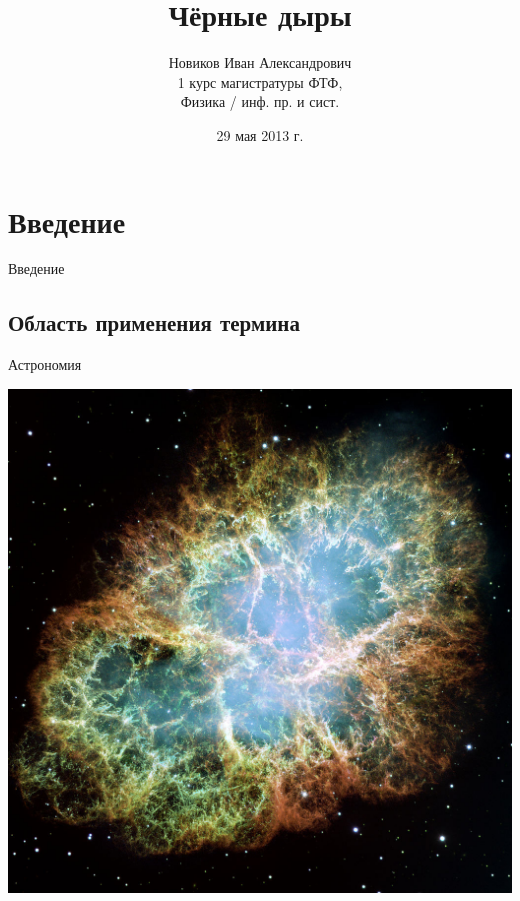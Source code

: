 \documentclass[usenames,dvipsnames,pdftex,unicode,hidelinks]{beamer}
\title[Чёрные дыры]{Чёрные дыры}
\author[Иван Новиков]{
  Новиков Иван Александрович\texorpdfstring{
    \\
    \vspace{0.5cm}
    \small 1 курс магистратуры ФТФ,\\
           Физика / инф. пр. и сист.
  }{
    - КубГУ, ФТФ, 1 курс магистратуры
  }
}
\institute{Кубанский Государственный Университет}
\date{ 29 мая 2013 г. }
\newcommand{\splashsection}[1]{
    \section{#1}
    \begin{frame}[plain]
      \begin{center}
        \huge #1
      \end{center}
    \end{frame}
  }
\begin{document}
  
  \begin{frame}[plain]
    \titlepage
  \end{frame}

  \splashsection{Введение}
  \subsection{Область применения термина}

  \begin{frame}{Астрономия}
    \begin{center}
      \includegraphics[height=0.8\textheight]{crab-nebula}
     \end{center}
  \end{frame}
\end{document}
